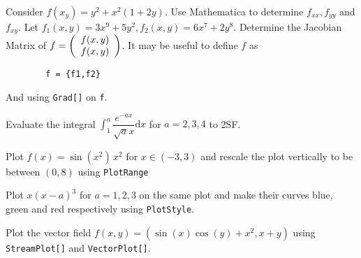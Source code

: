 \documentclass{exam}
\begin{document}
\begin{questions}
    \question Consider $f(x_y)=y^2+x^2(1+2y)$. Use Mathematica to determine $f_{xx},f_{yy}$ and $f_{xy}$.
    \question Let $f_1(x,y)=3x^9+5y^2, f_2(x,y)=6x^7+2y^8$. Determine the Jacobian Matrix of $f=\left(\begin{array}[1]{c} f(x,y) \\ f(x,y)\end{array}\right)$. It may be useful to define $f$ as 
    \begin{lstlisting}
        f = {f1,f2}
    \end{lstlisting}
    And using \lstinline[columns=fixed]{Grad[]} on \lstinline[columns=fixed]{f}.

    \question Evaluate the integral $\displaystyle\int_1^a \dfrac{e^{-ax}}{\sqrt{a}x}\mathrm{d}x$ for $a=2,3,4$ to 2SF.

    \question Plot $f(x)=\sin(x^2)\,x^2$ for $x\in(-3,3)$ and rescale the plot vertically to be between $(0,8)$ using \lstinline[columns=fixed]{PlotRange}

    \question Plot $x(x-a)^3$ for $a=1,2,3$ on the same plot and make their curves blue, green and red respectively using \lstinline[columns=fixed]{PlotStyle}.

    \question Plot the vector field $f(x,y)=(\sin(x)\cos(y)+x^2,x+y)$ using \lstinline[columns=fixed]{StreamPlot[]} and \lstinline[columns=fixed]{VectorPlot[]}.

\end{questions}
\end{document}
